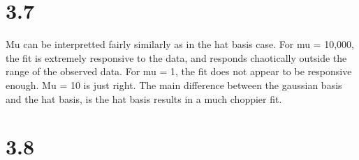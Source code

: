 \documentclass[11pt]{article}
\begin{document}
    \section{3.7}\label{section}

    Mu can be interpretted fairly similarly as in the hat basis case. For mu
= 10,000, the fit is extremely responsive to the data, and responds
chaotically outside the range of the observed data. For mu = 1, the fit
does not appear to be responsive enough. Mu = 10 is just right. The main
difference between the gaussian basis and the hat basis, is the hat
basis results in a much choppier fit.

    \section{3.8}\label{section}
\end{document}

